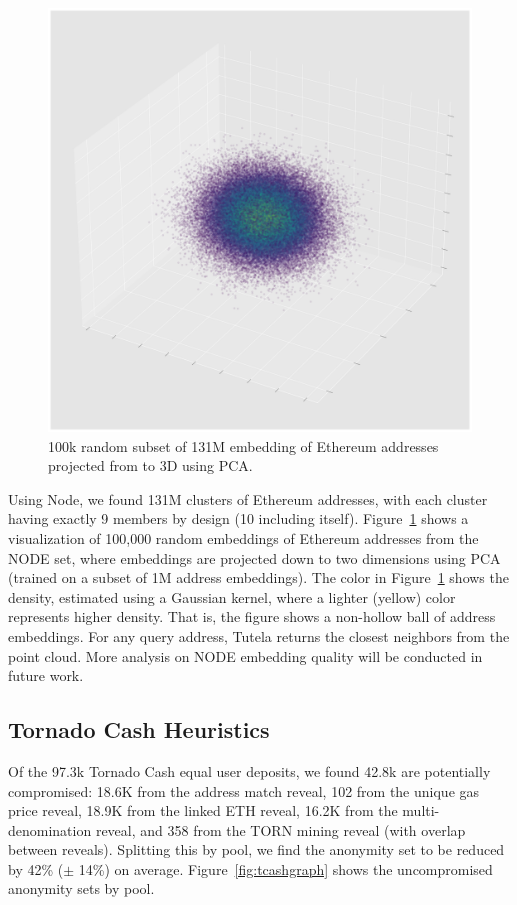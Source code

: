 \begin{figure}[h!]
\includegraphics[width=\linewidth]{figures/diff2vec_sample}
\caption{100k random subset of 131M embedding of Ethereum addresses projected from to 3D using PCA.}
\label{fig:diff2vecgraph}
\end{figure}
Using Node, we found 131M clusters of Ethereum addresses, with each cluster having exactly 9 members by design (10 including itself). Figure~\ref{fig:diff2vecgraph} shows a visualization of 100,000 random embeddings of Ethereum addresses from the NODE set, where embeddings are projected down to two dimensions using PCA (trained on a subset of 1M address embeddings). The color in Figure~\ref{fig:diff2vecgraph} shows the density, estimated using a Gaussian kernel, where a lighter (yellow) color represents higher density. That is, the figure shows a non-hollow ball of address embeddings. For any query address, Tutela returns the closest neighbors from the point cloud. 
More analysis on NODE embedding quality will be conducted in future work.

\subsection{Tornado Cash Heuristics}

Of the 97.3k Tornado Cash equal user deposits, we found 42.8k are potentially compromised: 18.6K from the address match reveal, 102 from the unique gas price reveal, 18.9K from the linked ETH reveal, 16.2K from the multi-denomination reveal, and 358 from the TORN mining reveal (with overlap between reveals). Splitting this by pool, we find the anonymity set to be reduced by 42\% ($\pm$ 14\%) on average. Figure~\ref{fig:tcashgraph} shows the uncompromised anonymity sets by pool.

